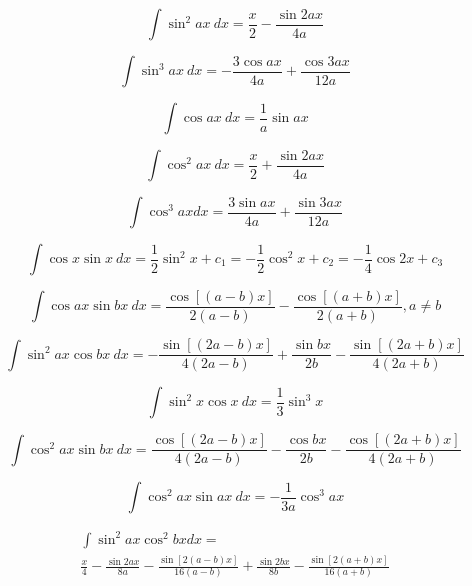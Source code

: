 \begin{equation*}
\int \sin^2 ax\  dx = \frac{x}{2} - \frac{\sin 2ax} {4a} 
\end{equation*}

\begin{equation*}
\int \sin^3 ax \ dx = -\frac{3 \cos ax}{4a} + \frac{\cos 3ax} {12a} 
\end{equation*}

\begin{equation*}
\int \cos ax\ dx= \frac{1}{a} \sin ax 
\end{equation*}

\begin{equation*}
\int \cos^2 ax\ dx = \frac{x}{2}+\frac{ \sin 2ax}{4a} 
\end{equation*}

\begin{equation*}
\int \cos^3 ax dx = \frac{3 \sin ax}{4a}+\frac{ \sin 3ax}{12a} 
\end{equation*}

\begin{equation*}\label{eq:veky}
\int \cos x \sin x\ dx = \frac{1}{2}\sin^2 x + c_1 = -\frac{1}{2} \cos^2x + c_2 = -\frac{1}{4} \cos 2x + c_3
\end{equation*}

\begin{equation*}
\int \cos ax \sin bx\ dx = \frac{\cos[(a-b) x]}{2(a-b)} -
\frac{\cos[(a+b)x]}{2(a+b)} , a\ne b
\end{equation*}

\begin{equation*}
\int \sin^2 ax \cos bx\ dx = 
-\frac{\sin[(2a-b)x]}{4(2a-b)} 
+ \frac{\sin bx}{2b} 
- \frac{\sin[(2a+b)x]}{4(2a+b)}
\end{equation*}

\begin{equation*}
\int \sin^2 x \cos x\ dx = \frac{1}{3} \sin^3 x
\end{equation*}

\begin{equation*}
\int \cos^2 ax \sin bx\ dx = \frac{\cos[(2a-b)x]}{4(2a-b)} 
- \frac{\cos bx}{2b}
- \frac{\cos[(2a+b)x]}{4(2a+b)}
\end{equation*}

\begin{equation*}
\int \cos^2 ax \sin ax\ dx = -\frac{1}{3a}\cos^3{ax} 
\end{equation*}

\begin{multline*}
\int \sin^2 ax \cos^2 bx dx = \\
\frac{x}{4}
-\frac{\sin 2ax}{8a}-
\frac{\sin[2(a-b)x]}{16(a-b)}
+\frac{\sin 2bx}{8b}-
\frac{\sin[2(a+b)x]}{16(a+b)}
\end{multline*}

